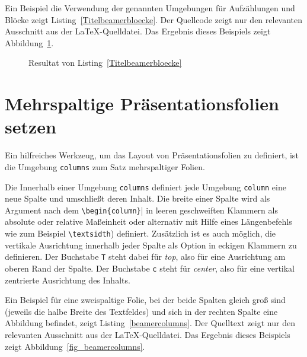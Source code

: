 \documentclass[a4paper,10pt,twoside]{scrbook}
\begin{document}
Ein Beispiel die Verwendung der genannten Umgebungen für Aufzählungen und Blöcke zeigt Listing~\ref{Titelbeamerbloecke}. Der Quellcode zeigt nur den relevanten Ausschnitt aus der \LaTeX-Quelldatei. Das Ergebnis dieses Beispiels zeigt Abbildung~\ref{fig_Titelbeamerbloecke}.






\begin{figure}[H]
	\caption{Resultat von Listing~\ref{Titelbeamerbloecke}}
	\label{fig_Titelbeamerbloecke}
\end{figure}

\section{Mehrspaltige Präsentationsfolien setzen}

Ein hilfreiches Werkzeug, um das Layout von Präsentationsfolien zu definiert, ist die Umgebung \verb!columns! zum Satz mehrspaltiger Folien.

Die Innerhalb einer Umgebung \verb|columns| definiert jede Umgebung \verb|column| eine neue Spalte und umschließt deren Inhalt. 
Die breite einer Spalte wird als Argument nach dem \verb!\begin{column}!| in leeren geschweiften Klammern als absolute oder relative Maßeinheit oder alternativ mit Hilfe eines Längenbefehls wie zum Beispiel \verb|\textsidth|) definiert. Zusätzlich ist es auch möglich, die vertikale Ausrichtung innerhalb jeder Spalte als Option in eckigen Klammern zu definieren. Der Buchstabe \verb|T| steht dabei für \emph{top}, also für eine Ausrichtung am oberen Rand der Spalte. Der Buchstabe \verb|c| steht für \emph{center}, also für eine vertikal zentrierte Ausrichtung des Inhalts. 

Ein Beispiel für eine zweispaltige Folie, bei der beide Spalten gleich groß sind (jeweils die halbe Breite des Textfeldes) und sich in der rechten Spalte eine Abbildung befindet, zeigt Listing~\ref{beamercolumns}. Der Quelltext zeigt nur den relevanten Ausschnitt aus der \LaTeX-Quelldatei. Das Ergebnis dieses Beispiels zeigt Abbildung~\ref{fig_beamercolumns}. 
\end{document}
